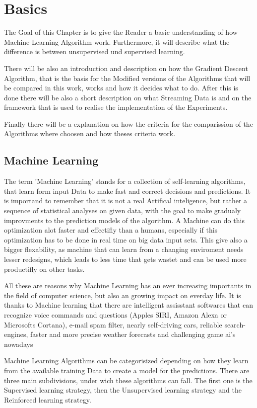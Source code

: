\documentclass[12pt,oneside,a4paper,parskip]{scrbook}
\begin{document}
\chapter{Basics}
The Goal of this Chapter is to give the Reader a basic understanding of how Machine Learning Algorithm work. 
Furthermore, it will describe what the difference is between unsupervised und supervised learning. 

There will be also an introduction and description on how the Gradient Descent Algorithm, that is the basis for the 
Modified versions of the Algorithms that will be compared in this work, works and how it decides what to do. 
After this is done there will be also a short description on what Streaming Data is and on the framework that is used to 
realise the implementation of the Experiments.

Finally there will be a explanation on how the criteria for the comparission of the Algorithms where choosen and how 
theses criteria work.

\section{Machine Learning}

The term 'Machine Learning' stands for a collection of self-learning algorithms, that learn form input Data to make 
fast and correct decisions and predictions. It is importand to remember that it is not a real Artifical inteligence, 
but rather a sequence of statistical analyses on given data, with the goal to make gradualy improvments to the prediction 
models of the algorithm.  
A Machine can do this optimization alot faster and effectifly than a humans, especially if this optimization has to be 
done in real time on big data input sets. This give also a bigger flexability, as machine that can learn from a changing 
enviroment needs lesser redesigns, which leads to less time that gets wastet and can be used more productifly on other 
tasks. 

All these are reasons why Machine Learning has an ever increasing importants in the field of computer science, 
but also an growing impact on everday life. It is thanks to Machine learning that there are intelligent assisstant 
softwares that can recognize voice commands and questions (Apples SIRI, Amazon Alexa or Microsofts Cortana),
e-mail spam filter, nearly self-driving cars, reliable search-engines, faster and more precise weather forecasts and 
challenging game ai's nowadays 

Machine Learning Algorithms can be categorisized depending on how they learn from the available training Data to create 
a model for the predictions. There are three main subdivisions, under wich these algorithms can fall. 
The first one is the Supervised learning strategy, then the Unsupervised learning strategy and the Reinforced learning 
strategy. 
\end{document}
